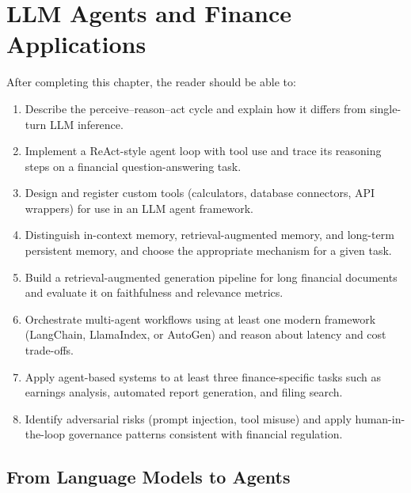 \chapter{LLM Agents and Finance Applications}
\label{ch:llm-agents}

\begin{remark}
After completing this chapter, the reader should be able to:
\begin{enumerate}
  \item Describe the perceive--reason--act cycle and explain how it differs from
        single-turn LLM inference.
  \item Implement a ReAct-style agent loop with tool use and trace its reasoning
        steps on a financial question-answering task.
  \item Design and register custom tools (calculators, database connectors, API
        wrappers) for use in an LLM agent framework.
  \item Distinguish in-context memory, retrieval-augmented memory, and long-term
        persistent memory, and choose the appropriate mechanism for a given task.
  \item Build a retrieval-augmented generation pipeline for long financial documents
        and evaluate it on faithfulness and relevance metrics.
  \item Orchestrate multi-agent workflows using at least one modern framework
        (LangChain, LlamaIndex, or AutoGen) and reason about latency and cost
        trade-offs.
  \item Apply agent-based systems to at least three finance-specific tasks such as
        earnings analysis, automated report generation, and filing search.
  \item Identify adversarial risks (prompt injection, tool misuse) and apply
        human-in-the-loop governance patterns consistent with financial regulation.
\end{enumerate}
\end{remark}


\section{From Language Models to Agents}
\label{sec:lm-to-agents}

